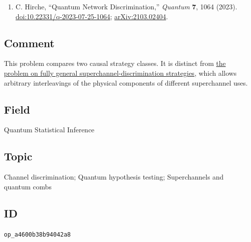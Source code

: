 \begin{enumerate}[label={},leftmargin=4.8em,labelsep=0.5em]
  \footnotesize
  \item[\textup{[Hir23]}]\label{ref:p66-hirche}
  C. Hirche, ``Quantum Network Discrimination,''
  \emph{Quantum} \textbf{7}, 1064 (2023).
  \href{https://doi.org/10.22331/q-2023-07-25-1064}{doi:10.22331/q-2023-07-25-1064};
  \href{https://arxiv.org/abs/2103.02404}{arXiv:2103.02404}.
\end{enumerate}

\subsection*{Comment}

This problem compares two causal strategy classes.  It is distinct from
\href{https://qiqc-op.com/problem/op_02bb8f8228649ac3/}{the problem on fully general superchannel-discrimination strategies}, which allows arbitrary interleavings of the
physical components of different superchannel uses.

\subsection*{Field}

Quantum Statistical Inference

\subsection*{Topic}

Channel discrimination; Quantum hypothesis testing; Superchannels and quantum combs

\subsection*{ID}

\texttt{op\_a4600b38b94042a8}
